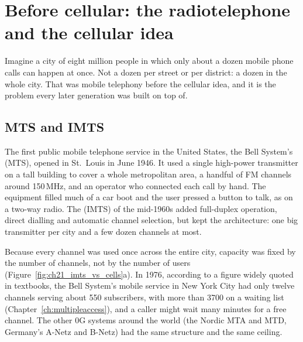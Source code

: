 \section{Before cellular: the radiotelephone and the cellular idea}
\label{sec:ch21:zerog}

Imagine a city of eight million people in which only about a dozen mobile phone calls can happen at
once. Not a dozen per street or per district: a dozen in the whole city. That was mobile telephony
before the cellular idea, and it is the problem every later generation was built on top of.

\subsection{MTS and IMTS}

The first public mobile telephone service in the United States, the Bell System's
 (MTS), opened in St.~Louis in June 1946. It used a single
high-power transmitter on a tall building to cover a whole metropolitan area, a handful of FM
channels around 150\,MHz, and an operator who connected each call by hand. The equipment filled
much of a car boot and the user pressed a button to talk, as on a two-way radio. The
 (IMTS) of the mid-1960s added full-duplex operation,
direct dialling and automatic channel selection, but kept the architecture: one big transmitter per
city and a few dozen channels at most.

Because every channel was used once across the entire city, capacity was fixed by the number of
channels, not by the number of users (Figure~\ref{fig:ch21_imts_vs_cells}a). In 1976, according to
a figure widely quoted in textbooks, the Bell System's mobile service in New York City had only
twelve channels serving about 550 subscribers, with more than 3700 on a waiting list
(Chapter~\ref{ch:multipleaccess}), and a caller might wait many minutes for a free channel. The
other 0G systems around the world (the Nordic MTA and MTD, Germany's A-Netz and B-Netz) had the same
structure and the same ceiling.


